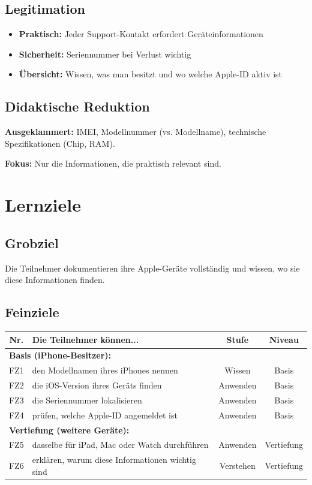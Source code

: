 \documentclass[11pt,a4paper]{article}
\begin{document}
\subsection{Legitimation}
\begin{itemize}
    \item \textbf{Praktisch:} Jeder Support-Kontakt erfordert Geräteinformationen
    \item \textbf{Sicherheit:} Seriennummer bei Verlust wichtig
    \item \textbf{Übersicht:} Wissen, was man besitzt und wo welche Apple-ID aktiv ist
\end{itemize}

\subsection{Didaktische Reduktion}
\textbf{Ausgeklammert:} IMEI, Modellnummer (vs. Modellname), technische Spezifikationen (Chip, RAM).

\textbf{Fokus:} Nur die Informationen, die praktisch relevant sind.

\section{Lernziele}

\subsection{Grobziel}
Die Teilnehmer dokumentieren ihre Apple-Geräte vollständig und wissen, wo sie diese Informationen finden.

\subsection{Feinziele}
\begin{tabular}{|c|p{7cm}|c|c|}
\hline
\textbf{Nr.} & \textbf{Die Teilnehmer können...} & \textbf{Stufe} & \textbf{Niveau} \\
\hline
\multicolumn{4}{|l|}{\textbf{Basis (iPhone-Besitzer):}} \\
\hline
FZ1 & den Modellnamen ihres iPhones nennen & Wissen & Basis \\
FZ2 & die iOS-Version ihres Geräts finden & Anwenden & Basis \\
FZ3 & die Seriennummer lokalisieren & Anwenden & Basis \\
FZ4 & prüfen, welche Apple-ID angemeldet ist & Anwenden & Basis \\
\hline
\multicolumn{4}{|l|}{\textbf{Vertiefung (weitere Geräte):}} \\
\hline
FZ5 & dasselbe für iPad, Mac oder Watch durchführen & Anwenden & Vertiefung \\
FZ6 & erklären, warum diese Informationen wichtig sind & Verstehen & Vertiefung \\
\hline
\end{tabular}
\end{document}
